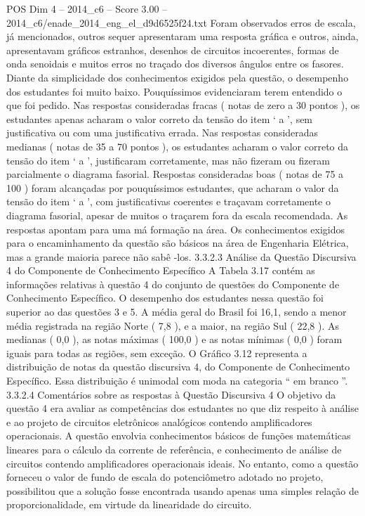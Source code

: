 \begin{textsample}{POS Dim 4 – 2014\_c6 – Score 3.00 – 2014\_c6/enade\_2014\_eng\_el\_d9d6525f24.txt}
Foram observados erros de escala, já mencionados, outros sequer apresentaram uma resposta gráfica e outros, ainda, apresentavam gráficos estranhos, desenhos de circuitos incoerentes, formas de onda senoidais e muitos erros no traçado dos diversos ângulos entre os fasores.
Diante da simplicidade dos conhecimentos exigidos pela questão, o desempenho dos estudantes foi muito baixo.
Pouquíssimos evidenciaram terem entendido o que foi pedido.
Nas respostas consideradas fracas ( notas de zero a 30 pontos ), os estudantes apenas acharam o valor correto da tensão do item ‘ a ’, sem justificativa ou com uma justificativa errada.
Nas respostas consideradas medianas ( notas de 35 a 70 pontos ), os estudantes acharam o valor correto da tensão do item ‘ a ’, justificaram corretamente, mas não fizeram ou fizeram parcialmente o diagrama fasorial.
Respostas consideradas boas ( notas de 75 a 100 ) foram alcançadas por pouquíssimos estudantes, que acharam o valor da tensão do item ‘ a ’, com justificativas coerentes e traçavam corretamente o diagrama fasorial, apesar de muitos o traçarem fora da escala recomendada.
As respostas apontam para uma má formação na área.
Os conhecimentos exigidos para o encaminhamento da questão são básicos na área de Engenharia Elétrica, mas a grande maioria parece não sabê -los. 3.3.2.3 Análise da Questão Discursiva 4 do Componente de Conhecimento Específico A Tabela 3.17 contém as informações relativas à questão 4 do conjunto de questões do Componente de Conhecimento Específico.
O desempenho dos estudantes nessa questão foi superior ao das questões 3 e 5.
A média geral do Brasil foi 16,1, sendo a menor média registrada na região Norte ( 7,8 ), e a maior, na região Sul ( 22,8 ).
As medianas ( 0,0 ), as notas máximas ( 100,0 ) e as notas mínimas ( 0,0 ) foram iguais para todas as regiões, sem exceção.
O Gráfico 3.12 representa a distribuição de notas da questão discursiva 4, do Componente de Conhecimento Específico.
Essa distribuição é unimodal com moda na categoria “ em branco ”. 3.3.2.4 Comentários sobre as respostas à Questão Discursiva 4 O objetivo da questão 4 era avaliar as competências dos estudantes no que diz respeito à análise e ao projeto de circuitos eletrônicos analógicos contendo amplificadores operacionais.
A questão envolvia conhecimentos básicos de funções matemáticas lineares para o cálculo da corrente de referência, e conhecimento de análise de circuitos contendo amplificadores operacionais ideais.
No entanto, como a questão forneceu o valor de fundo de escala do potenciômetro adotado no projeto, possibilitou que a solução fosse encontrada usando apenas uma simples relação de proporcionalidade, em virtude da linearidade do circuito.

\end{textsample}
